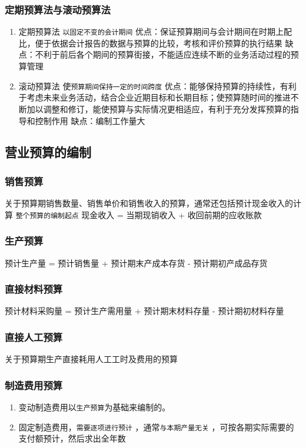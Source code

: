 \documentclass[11pt]{article}
\begin{document}
\subsubsection{定期预算法与滚动预算法}
\label{sec:orgfad8d2b}
\begin{enumerate}
\item 定期预算法
\label{sec:org4956234}
\texttt{以固定不变的会计期间}
优点：保证预算期间与会计期间在时期上配比，便于依据会计报告的数据与预算的比较，考核和评价预算的执行结果
缺点：不利于前后各个期间的预算街接，不能适应连续不断的业务活动过程的预算管理
\item 滚动预算法
\label{sec:org6169b7a}
使\texttt{预算期间保持一定的时间跨度}
优点：能够保持预算的持续性，有利于考虑未来业务活动，结合企业近期目标和长期目标；使预算随时间的推进不断加以调整和修订，能使预算与实际情况更相适应，有利于充分发挥预算的指导和控制作用
缺点：编制工作量大
\end{enumerate}
\subsection{营业预算的编制}
\label{sec:org9b2f52b}
\subsubsection{销售预算}
\label{sec:orge4dc265}
关于预算期销售数量、销售单价和销售收入的预算，通常还包括预计现金收入的计算
\texttt{整个预算的编制起点}
现金收入 = 当期现销收入 + 收回前期的应收账款
\subsubsection{生产预算}
\label{sec:orgbfa2dec}
预计生产量 = 预计销售量 + 预计期末产成本存货 - 预计期初产成品存货
\subsubsection{直接材料预算}
\label{sec:orga9efe9f}
预计材料采购量 = 预计生产需用量 + 预计期末材料存量 - 预计期初材料存量
\subsubsection{直接人工预算}
\label{sec:orgda39c9b}
关于预算期生产直接耗用人工工时及费用的预算
\subsubsection{制造费用预算}
\label{sec:org9deb980}
\begin{enumerate}
\item 变动制造费用以\texttt{生产预算}为基础来编制的。
\item 固定制造费用，\texttt{需要逐项进行预计} ，通常\texttt{与本期产量无关} ，可按各期实际需要的支付额预计，然后求出全年数
\end{enumerate}
\end{document}
